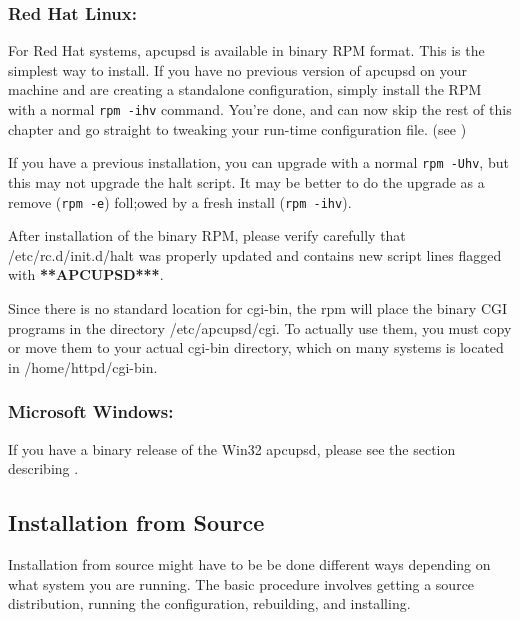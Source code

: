 \subsubsection*{Red Hat Linux:}

\label{index-Installing_002c-Red-Hat-20}
For Red Hat systems, apcupsd is available in binary RPM format.  This is the
simplest way to install. If you have no previous version of apcupsd on your
machine and are creating a standalone configuration, simply install the RPM
with a normal {\tt rpm -ihv} command. You're done, and can now skip the rest
of this chapter and go straight to tweaking your run-time configuration file.
(see 
)  

If you have a previous installation, you can upgrade with a normal {\tt rpm
-Uhv}, but this may not upgrade the halt script. It may be better to do the
upgrade as a remove ({\tt rpm -e}) foll;owed by a fresh install ({\tt rpm
-ihv}).  

After installation of the binary RPM, please verify carefully that
/etc/rc.d/init.d/halt was properly updated and contains new script lines
flagged with {\bf ***APCUPSD***}.  

Since there is no standard location for cgi-bin, the rpm will place the binary
CGI programs in the directory /etc/apcupsd/cgi. To actually use them, you must
copy or move them to your actual cgi-bin directory, which on many systems is
located in /home/httpd/cgi-bin. 

\label{Microsoft-Windows}

\subsubsection*{Microsoft Windows:}

\label{index-Installing_002c-Microsoft-21}
If you have a binary release of the Win32 apcupsd, please see the section
describing
.

\label{Installation-from-Source}

\subsection*{Installation from Source}

Installation from source might have to be be done different ways depending on
what system you are running. The basic procedure involves getting a source
distribution, running the configuration, rebuilding, and installing.  

